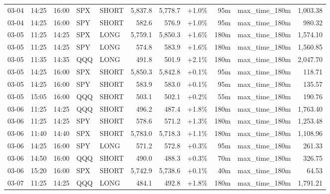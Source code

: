 \documentclass[11pt,a4paper,twoside]{article}
\begin{document}
\begin{center}
\begin{longtable}{>{\color{txtmain}}l l l l l r r r r >{\color{txtmain}}l r}
03-04 & 14:25 & 16:00 & SPX & SHORT & 5,837.8 & 5,778.7 & \textcolor{wingreen}{+1.0\%} & 95m & max\_time\_180m & \textcolor{wingreen}{1,003.38} \\
03-04 & 14:25 & 16:00 & SPY & SHORT & 582.6 & 576.9 & \textcolor{wingreen}{+1.0\%} & 95m & max\_time\_180m & \textcolor{wingreen}{980.32} \\
03-05 & 11:25 & 14:25 & SPX & LONG & 5,759.1 & 5,850.3 & \textcolor{wingreen}{+1.6\%} & 180m & max\_time\_180m & \textcolor{wingreen}{1,574.10} \\
03-05 & 11:25 & 14:25 & SPY & LONG & 574.8 & 583.9 & \textcolor{wingreen}{+1.6\%} & 180m & max\_time\_180m & \textcolor{wingreen}{1,560.85} \\
03-05 & 11:35 & 14:35 & QQQ & LONG & 491.8 & 501.9 & \textcolor{wingreen}{+2.1\%} & 180m & max\_time\_180m & \textcolor{wingreen}{2,047.70} \\
03-05 & 14:25 & 16:00 & SPX & SHORT & 5,850.3 & 5,842.8 & \textcolor{wingreen}{+0.1\%} & 95m & max\_time\_180m & \textcolor{wingreen}{118.71} \\
03-05 & 14:25 & 16:00 & SPY & SHORT & 583.9 & 583.0 & \textcolor{wingreen}{+0.1\%} & 95m & max\_time\_180m & \textcolor{wingreen}{135.57} \\
03-05 & 15:05 & 16:00 & QQQ & SHORT & 503.1 & 502.1 & \textcolor{wingreen}{+0.2\%} & 55m & max\_time\_180m & \textcolor{wingreen}{190.76} \\
03-06 & 11:25 & 14:25 & QQQ & SHORT & 496.2 & 487.4 & \textcolor{wingreen}{+1.8\%} & 180m & max\_time\_180m & \textcolor{wingreen}{1,763.40} \\
03-06 & 11:25 & 14:25 & SPY & SHORT & 578.6 & 571.2 & \textcolor{wingreen}{+1.3\%} & 180m & max\_time\_180m & \textcolor{wingreen}{1,253.48} \\
03-06 & 11:40 & 14:40 & SPX & SHORT & 5,783.0 & 5,718.3 & \textcolor{wingreen}{+1.1\%} & 180m & max\_time\_180m & \textcolor{wingreen}{1,108.96} \\
03-06 & 14:25 & 16:00 & SPY & LONG & 571.2 & 572.8 & \textcolor{wingreen}{+0.3\%} & 95m & max\_time\_180m & \textcolor{wingreen}{261.33} \\
03-06 & 14:50 & 16:00 & QQQ & SHORT & 490.0 & 488.3 & \textcolor{wingreen}{+0.3\%} & 70m & max\_time\_180m & \textcolor{wingreen}{326.75} \\
03-06 & 15:20 & 16:00 & SPX & SHORT & 5,742.9 & 5,738.6 & \textcolor{wingreen}{+0.1\%} & 40m & max\_time\_180m & \textcolor{wingreen}{64.53} \\
03-07 & 11:25 & 14:25 & QQQ & LONG & 484.1 & 492.8 & \textcolor{wingreen}{+1.8\%} & 180m & max\_time\_180m & \textcolor{wingreen}{1,791.21} \\

\end{longtable}
\end{center}
\end{document}
